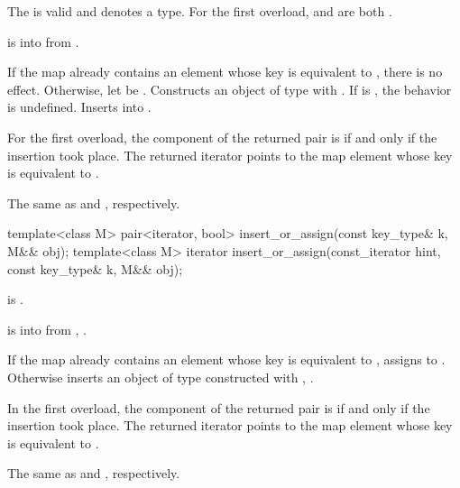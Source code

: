 \begin{itemdescr}
\pnum
\constraints
The  
is valid and denotes a type.
For the first overload,
 and
are both .

\pnum
\expects
{} is  into  from
.

\pnum
\effects
If the map already contains an element whose key is equivalent to ,
there is no effect.
Otherwise, let  be .
Constructs an object  of type  with
.\linebreak
If  is ,
the behavior is undefined.
Inserts  into .

\pnum
\returns
For the first overload,
the  component of the returned pair is 
if and only if the insertion took place.
The returned iterator points to the map element
whose key is equivalent to .

\pnum
\complexity
The same as  and , respectively.
\end{itemdescr}

%
\begin{itemdecl}
template<class M>
  pair<iterator, bool> insert_or_assign(const key_type& k, M&& obj);
template<class M>
  iterator insert_or_assign(const_iterator hint, const key_type& k, M&& obj);
\end{itemdecl}

\begin{itemdescr}
\pnum
\mandates
{} is .

\pnum
\expects
{} is  into 
from , .

\pnum
\effects
If the map already contains an element 
whose key is equivalent to ,
assigns  to .
Otherwise inserts an object of type 
constructed with , .

\pnum
\returns
In the first overload,
the  component of the returned pair is 
if and only if the insertion took place.
The returned iterator points to the map element
whose key is equivalent to .

\pnum
\complexity
The same as  and ,
respectively.
\end{itemdescr}

